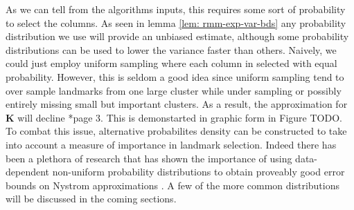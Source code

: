 As we can tell from the algorithms inputs, this requires some sort of probability to select the columns. As seen in lemma \ref{lem: rmm-exp-var-bds} any probability distribution we use will provide an unbiased estimate, although some probability distributions can be used to lower the variance faster than others. Naively, we could just employ uniform sampling where each column in selected with equal probability. However, this is seldom a good idea since uniform sampling tend to over sample landmarks from one large cluster while under sampling or possibly entirely missing small but important clusters. As a result, the approximation for $\bm{K}$ will decline \cite{musco2017recursive}*{page 3}. This is demonstarted in graphic form in Figure TODO. To combat this issue, alternative probabilites density can be constructed to take into account a measure of importance in landmark selection. Indeed there has been a plethora of research that has shown the importance of using data-dependent non-uniform probability distributions to obtain proveably good error bounds on Nystrom approximations \cite{JMLR:v6:drineas05a,DBLP:journals/corr/abs-1303-1849,musco2017recursive,DBLP:journals/corr/abs-1109-3843,DBLP:journals/corr/CohenMM15,kumar2009sampling}. A few of the more common distributions will be discussed in the coming sections.